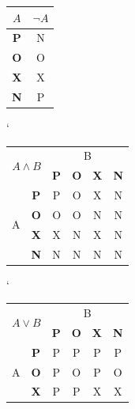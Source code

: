 \documentclass[a4paper, 11pt]{article}
\begin{document}
\begin{table}[h]
    \centering
    \begin{tabular}{|c|c|}
        \hline
        $A$              & $\neg A$    \\ \hline
        \textbf{P} & N \\ \hline
        \textbf{O} & O \\ \hline
        \textbf{X} & X \\ \hline
        \textbf{N} & P \\ \hline
    \end{tabular}
    \catcode`
    \begin{tabular}{|c|c|c|c|c|c|}
        \hline
        \multicolumn{2}{|c|}{\multirow{2}{*}{$A \wedge B$}} & \multicolumn{4}{c|}{B}                            \\ \cline{3-6} 
        \multicolumn{2}{|c|}{}                     & \textbf{P} & \textbf{O} & \textbf{X} & \textbf{N} \\ \hline
        \multirow{4}{*}{A}       & \textbf{P}      & P          & O          & X          & N          \\ \cline{2-6} 
                                 & \textbf{O}      & O          & O          & N          & N          \\ \cline{2-6} 
                                 & \textbf{X}      & X          & N          & X          & N          \\ \cline{2-6} 
                                 & \textbf{N}      & N          & N          & N          & N          \\ \hline
    \end{tabular}
    \catcode`
    \begin{tabular}{|c|c|c|c|c|c|}
        \hline
        \multicolumn{2}{|c|}{\multirow{2}{*}{$A \vee B$}} & \multicolumn{4}{c|}{B}                            \\ \cline{3-6} 
        \multicolumn{2}{|c|}{}                     & \textbf{P} & \textbf{O} & \textbf{X} & \textbf{N} \\ \hline
        \multirow{4}{*}{A}       & \textbf{P}      & P          & P          & P          & P          \\ \cline{2-6} 
                                 & \textbf{O}      & P          & O          & P          & O          \\ \cline{2-6} 
                                 & \textbf{X}      & P          & P          & X          & X          \\ \cline{2-6} 

\end{tabular}
\end{table}
\end{document}
